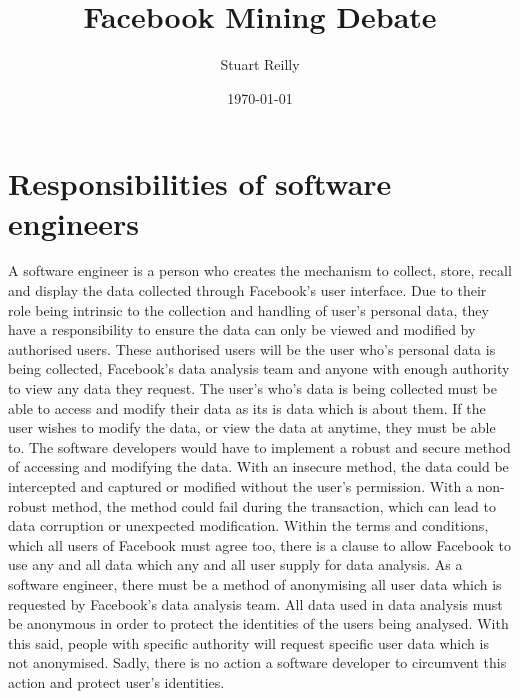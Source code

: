 \documentclass[12pt]{article}
\title{Facebook Mining Debate}
\author{Stuart Reilly}
\date{\today}
\begin{document}
\maketitle
\section{Responsibilities of software engineers}
	A software engineer is a person who creates the mechanism to collect, store, recall and display the data collected through Facebook's user interface.
	Due to their role being intrinsic to the collection and handling of user's personal data, they have a responsibility to ensure the data can only be viewed and modified by authorised users.
	These authorised users will be the user who's personal data is being collected, Facebook's data analysis team and anyone with enough authority to view any data they request.
	The user's who's data is being collected must be able to access and modify their data as its is data which is about them.
	If the user wishes to modify the data, or view the data at anytime, they must be able to.
	The software developers would have to implement a robust and secure method of accessing and modifying the data.
	With an insecure method, the data could be intercepted and captured or modified without the user's permission.
	With a non-robust method, the method could fail during the transaction, which can lead to data corruption or unexpected modification.
	Within the terms and conditions, which all users of Facebook must agree too, there is a clause to allow Facebook to use any and all data which any and all user supply for data analysis.
	As a software engineer, there must be a method of anonymising all user data which is requested by Facebook's data analysis team.
	All data used in data analysis must be anonymous in order to protect the identities of the users being analysed.
	With this said, people with specific authority will request specific user data which is not anonymised.
	Sadly, there is no action a software developer to circumvent this action and protect user's identities.
\end{document}
